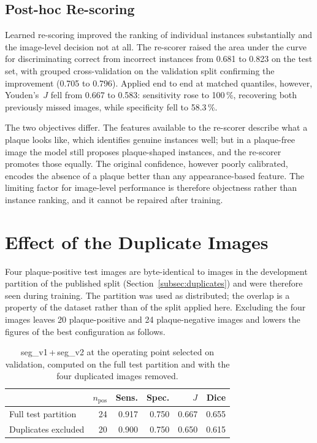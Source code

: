 \subsection{Post-hoc Re-scoring}
\label{subsec:results-rescoring}

Learned re-scoring improved the ranking of individual instances substantially and the image-level
decision not at all. The re-scorer raised the area under the curve for discriminating correct from
incorrect instances from 0.681 to 0.823 on the test set, with grouped cross-validation on the
validation split confirming the improvement (0.705 to 0.796). Applied end to end at matched
quantiles, however, Youden's~$J$ fell from 0.667 to 0.583: sensitivity rose to 100\,\%, recovering
both previously missed images, while specificity fell to 58.3\,\%.

The two objectives differ. The features available to the re-scorer describe what a plaque looks
like, which identifies genuine instances well; but in a plaque-free image the model still proposes
plaque-shaped instances, and the re-scorer promotes those equally. The original confidence,
however poorly calibrated, encodes the absence of a plaque better than any appearance-based
feature. The limiting factor for image-level performance is therefore objectness rather than
instance ranking, and it cannot be repaired after training.

\section{Effect of the Duplicate Images}
\label{sec:results-duplicates}

Four plaque-positive test images are byte-identical to images in the development partition of
the published split (Section~\ref{subsec:duplicates}) and were therefore seen during training.
The partition was used as distributed; the overlap is a property of the dataset rather than of
the split applied here. Excluding the four images leaves
20 plaque-positive and 24 plaque-negative images and lowers the figures of the best configuration
as follows.

\begin{table}[H]
\centering
\caption[Performance with and without the duplicated images]{seg\_v1\,+\,seg\_v2 at the operating
point selected on validation, computed on the full test partition and with the four duplicated
images removed.}
\label{tab:dedup}
\begin{tabular}{lrrrrr}
\hline
& $n_{\text{pos}}$ & Sens. & Spec. & $J$ & Dice \\
\hline
Full test partition & 24 & 0.917 & 0.750 & 0.667 & 0.655 \\
Duplicates excluded & 20 & 0.900 & 0.750 & 0.650 & 0.615 \\
\hline
\end{tabular}
\end{table}

